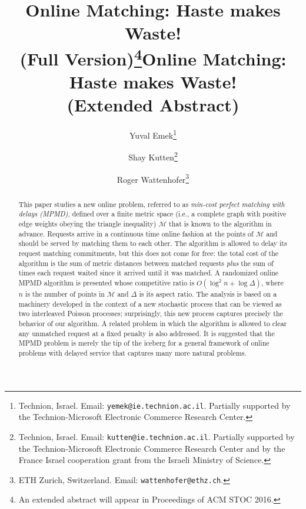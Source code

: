 \documentclass[11pt]{article}
\def\LongVersion{}
\def\LongVersionEnd{}
\def\ShortVersion{}
\def\ShortVersionEnd{}
\theoremstyle{definition}
\theoremstyle{plain}
\theoremstyle{definition}
\theoremstyle{plain}
\theoremstyle{definition}
\theoremstyle{plain}
\begin{document}
\LongVersion %
\title{Online Matching: Haste makes Waste! \\ (Full Version)\footnote{%
An extended abstract will appear in Proceedings of ACM STOC 2016.
}}
\LongVersionEnd %
%
\ShortVersion %
\title{Online Matching: Haste makes Waste! \\ (Extended Abstract)}
\ShortVersionEnd %

\date{}

\author{%
Yuval Emek\thanks{%
Technion, Israel.
Email: \texttt{yemek@ie.technion.ac.il}.
Partially supported by the Technion-Microsoft Electronic Commerce Research
Center.}
\and
Shay Kutten\thanks{%
Technion, Israel.
Email: \texttt{kutten@ie.technion.ac.il}.
Partially supported by the Technion-Microsoft Electronic Commerce Research
Center and by the France Israel cooperation grant from the Israeli Ministry of
Science.}
\and
Roger Wattenhofer\thanks{%
ETH Zurich, Switzerland.
Email: \texttt{wattenhofer@ethz.ch}.}
}

\begin{titlepage}

\maketitle

\begin{abstract}
This paper studies a new online problem, referred to as \emph{min-cost
perfect matching with delays (MPMD)}, defined over a finite metric
space (i.e., a complete graph with positive edge weights obeying
the triangle inequality) $\mathcal{M}$ that is known to the algorithm in
advance.
Requests arrive in a continuous time online fashion at the points of
$\mathcal{M}$ and should be served by matching them to each other.
The algorithm is allowed to delay its request matching commitments, but this
does not come for free:
the total cost of the algorithm is the sum of metric distances between matched
requests \emph{plus} the sum of times each request waited since it arrived
until it was matched.
A randomized online MPMD algorithm is presented whose competitive
ratio is
$O (\log^{2} n + \log \Delta)$,
where $n$ is the number of points in $\mathcal{M}$ and $\Delta$ is its aspect
ratio.
The analysis is based on a machinery developed in the context of a new
stochastic process that can be viewed as two interleaved Poisson processes;
surprisingly, this new process captures precisely the behavior of our
algorithm.
A related problem in which the algorithm is allowed to clear any unmatched
request at a fixed penalty is also addressed.
It is suggested that the MPMD problem is merely the tip of the iceberg for a
general framework of online problems with delayed service that captures
many more natural problems.
\end{abstract}

\renewcommand{\thepage}{}
\end{titlepage}
\end{document}

